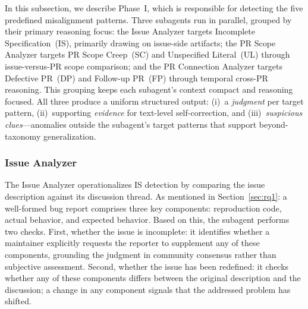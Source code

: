 \documentclass[sigconf, review, anonymous]{acmart}
\begin{document}
    In this subsection, we describe Phase~I, which is responsible for detecting the five predefined misalignment patterns. Three subagents run in parallel, grouped by their primary reasoning focus: the Issue Analyzer targets Incomplete Specification~(IS), primarily drawing on issue-side artifacts; the PR Scope Analyzer targets PR Scope Creep~(SC) and Unspecified Literal~(UL) through issue-versus-PR scope comparison; and the PR Connection Analyzer targets Defective PR~(DP) and Follow-up PR~(FP) through temporal cross-PR reasoning. This grouping keeps each subagent's context compact and reasoning focused. All three produce a uniform structured output: (i)~a \textit{judgment} per target pattern, (ii)~supporting \textit{evidence} for text-level self-correction, and (iii)~\textit{suspicious clues}---anomalies outside the subagent's target patterns that support beyond-taxonomy generalization.

    \subsubsection{Issue Analyzer}
    \label{sec:issue_analyzer}

The Issue Analyzer operationalizes IS detection by comparing the                                                                         
  issue description against its discussion thread. As mentioned in Section~\ref{sec:rq1}: a well-formed bug                                                                     
  report comprises three key components: reproduction code, actual                                                                         
  behavior, and expected behavior. Based on this, the                                                                             
  subagent performs two checks. First, whether the issue is                                                                                
  incomplete: it identifies whether a maintainer explicitly requests                                                                       
  the reporter to supplement any of these components, grounding the                                                                        
  judgment in community consensus rather than subjective assessment.                                                                     
 Second, whether the issue has been redefined: it checks whether any of these components differs between the original description and the discussion; a change in any component signals that the addressed problem has shifted.       
\end{document}
